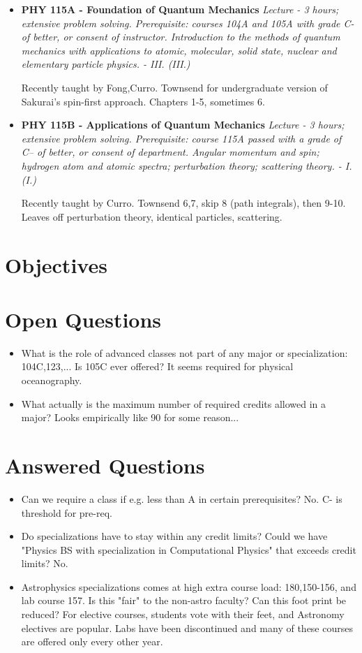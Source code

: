 \documentclass[12pt]{article}
\begin{document}
\begin{itemize}
\item {\bf PHY 115A - Foundation of Quantum Mechanics}
{\it Lecture - 3 hours; extensive problem solving. Prerequisite: courses 104A and 105A with grade C- of better, or consent of instructor. Introduction to the methods of quantum mechanics with applications to atomic, molecular, solid state, nuclear and elementary particle physics. - III. (III.)} 

Recently taught by Fong,Curro.  Townsend for undergraduate version of Sakurai's spin-first approach.  Chapters 1-5, sometimes 6.

\item {\bf PHY 115B - Applications of Quantum Mechanics}
{\it Lecture - 3 hours; extensive problem solving. Prerequisite: course 115A passed with a grade of C– of better, or consent of department. Angular momentum and spin; hydrogen atom and atomic spectra; perturbation theory; scattering theory. - I. (I.)}

Recently taught by Curro.  Townsend 6,7, skip 8 (path integrals), then 9-10.
Leaves off perturbation theory, identical particles, scattering.

\end{itemize}


\section{Objectives}

\section{Open Questions}
\begin{itemize}
\item What is the role of advanced classes not part of any major or specialization:  104C,123,...  Is 105C ever offered?  It seems required for physical oceanography.
\item What actually is the maximum number of required credits allowed in a major?
Looks empirically like 90 for some reason...
\end{itemize}

\section{Answered Questions}
\begin{itemize}
\item Can we require a class if e.g. less than A in certain prerequisites? No.  C- is threshold for pre-req.
\item Do specializations have to stay within any credit limits?  Could we have "Physics BS with specialization in Computational Physics" that exceeds credit limits?  No.
\item Astrophysics specializations comes at high extra course load:  180,150-156, and lab course 157.  Is this "fair" to the non-astro faculty?  Can this foot print be reduced?  For elective courses, students vote with their feet, and Astronomy electives are popular.  Labs have been discontinued and many of these courses are offered only every other year. 
\end{itemize}
\end{document}
